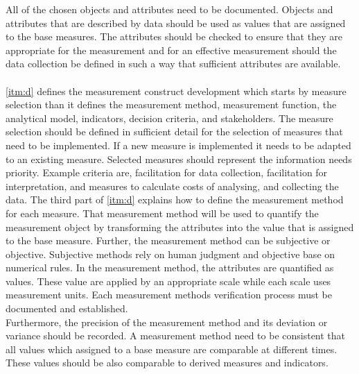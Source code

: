 All of the chosen objects and attributes need to be documented. Objects and attributes that are described by data should be used as values that are assigned to the base measures. The attributes should be checked to ensure that they are appropriate for the measurement and for an effective measurement should the data collection be defined in such a way that sufficient attributes are available. \\ \\
\ref{itm:d} defines the measurement construct development which starts by measure selection than it defines the measurement method, measurement function, the analytical model, indicators, decision criteria, and stakeholders. The measure selection should be defined in sufficient detail for the selection of measures that need to be implemented. If a new measure is implemented it needs to be adapted to an existing measure. Selected measures should represent the information needs priority. Example criteria are, facilitation for data collection, facilitation for interpretation, and measures to calculate costs of analysing, and collecting the data. The third part of \ref{itm:d} explains how to define the measurement method for each measure. That measurement method will be used to quantify the measurement object by transforming the attributes into the value that is assigned to the base measure. Further, the measurement method can be subjective or objective. Subjective methods rely on human judgment and objective base on numerical rules. In the measurement method, the attributes are quantified as values. These value are applied by an appropriate scale while each scale uses measurement units. Each measurement methods verification process must be documented and established. \\
Furthermore, the precision of the measurement method and its deviation or variance should be recorded. A measurement method need to be consistent that all values which assigned to a base measure are comparable at different times. These values should be also comparable to derived measures and indicators. \\
